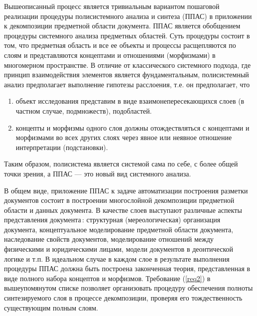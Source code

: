 \documentclass[utf8]{../IncArticle}
\begin{document}
Вышеописанный процесс является тривиальным вариантом пошаговой
реализации процедуры полисистемного анализа и синтеза \cite{father}
(ППАС) в приложении к декомпозиции предметной области документа. ППАС
является обобщением процедуры системного анализа предметных областей.
Суть процедуры состоит в том, что предметная область и все ее объекты
и процессы расщепляются по слоям и представляются концептами и
отношениями (морфизмами) в многомерном пространстве.  В отличие от
классического системного подхода, где принцип взаимодействия элементов
является фундаментальным, полисистемный анализ предполагает выполнение
гипотезы расслоения, т.е. он предполагает, что
\begin{enumerate}
\item объект исследования представим в виде взаимонепересекающихся
  слоев (в частном случае, подмножеств), подобластей. \label{req1}
\item концепты и морфизмы одного слоя должны отождествляться с
  концептами и морфизмами во всех других слоях через явное или неявное
  отношение интерпретации (подстановки). \label{req2}
\end{enumerate}
Таким образом, полисистема является системой сама по себе, с более
общей точки зрения, а ППАС --- это новый вид системного анализа.

В общем виде, приложение ППАС к задаче автоматизации построения
разметки документов состоит в построении многослойной декомпозиции
предметной области и данных документа. В качестве слоев выступают
различные аспекты представления документа\,: структурная
(мереологическая) организация документа, концептуальное моделирование
предметной области документа, наследование свойств документов,
моделирование отношений между физическими и юридическими лицами,
модели документов в деонтической логике и т.п.  В идеальном случае в
каждом слое в результате выполнения процедуры ППАС должна быть
построена законченная теория, представленная в виде полного набора
концептов и морфизмов.  Требование (\ref{req2}) в вышеупомянутом
списке позволяет организовать процедуру обеспечения полноты
синтезируемого слоя в процессе декомпозиции, проверяя его
тождественность существующим полным слоям.

\end{document}
